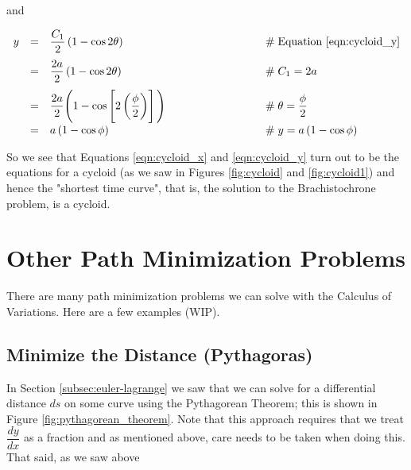 \documentclass{article}
\theoremstyle{definition}
\begin{document}
\bigskip
\noindent
and

\bigskip
\begin{equation*}
\begin{array}{lllll}
y	
&=& \dfrac{C_1}{2} \left ( 1 - \cos 2 \theta \right )
			&\qquad \qquad \qquad \qquad \mathrel{\#} \text{Equation \ref{eqn:cycloid_y}} \\
[10pt]
&=& \dfrac{2a}{2} \left ( 1 - \cos 2 \theta \right )
			&\qquad \qquad \qquad \qquad \mathrel{\#} C_1 = 2 a \\
[10pt]
&=& \dfrac{2a}{2} \Bigg ( 1 - \cos \left [ 2 \left (\dfrac{\phi}{2} \right ) \right ] \Bigg )
			&\qquad \qquad \qquad \qquad \mathrel{\#} \theta = \dfrac{\phi}{2} \\
[10pt]
&=& a \left ( 1 - \cos \phi \right )
			&\qquad \qquad \qquad \qquad \mathrel{\#} y = a \left (1 - \cos \phi \right)
\end{array}
\end{equation*}


\bigskip
\noindent
So we see that Equations \ref{eqn:cycloid_x} and
\ref{eqn:cycloid_y} turn out to be the equations for a cycloid
(as we saw in Figures \ref{fig:cycloid} and \ref{fig:cycloid1})
and hence the "shortest time curve", that is, the solution to the
Brachistochrone problem, is a cycloid.

\section{Other Path Minimization Problems}
There are many path minimization problems we can solve with the
Calculus of Variations. Here are a few examples (WIP).

\subsection{Minimize the Distance (Pythagoras)}
{ In Section \ref{subsec:euler-lagrange} we saw
that we can solve for a differential distance $ds$ on some curve
using the Pythagorean Theorem; this is shown in Figure
\ref{fig:pythagorean_theorem}. Note that this approach requires
that we treat $\dfrac{dy}{dx}$ as a fraction and as mentioned
above, care needs to be taken when doing this. That said, as we
saw above \par}
\end{document}
